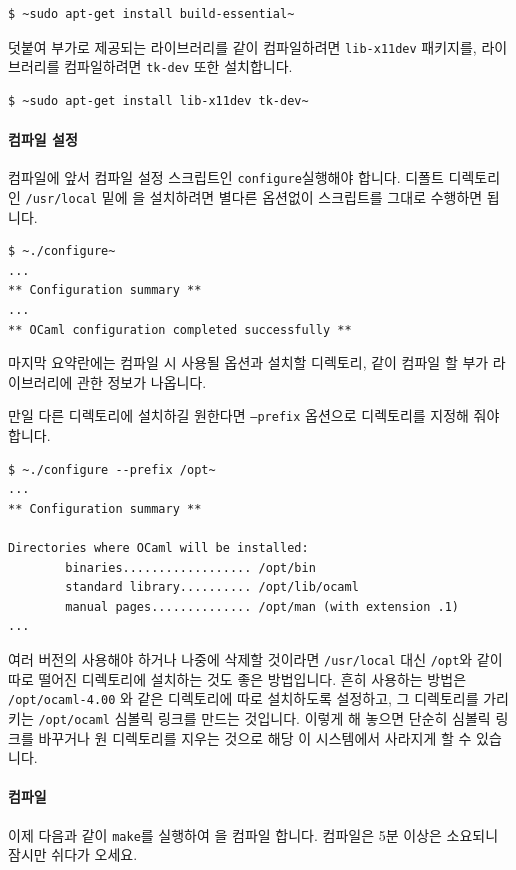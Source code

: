 \begin{lstlisting}
$ ~sudo apt-get install build-essential~
\end{lstlisting}

덧붙여 부가로 제공되는 \GRAPHICS{} 라이브러리를 같이 컴파일하려면
\texttt{lib-x11dev} 패키지를, \LABLTK{} 라이브러리를 컴파일하려면 \texttt{tk-dev}
또한 설치합니다.

\begin{lstlisting}
$ ~sudo apt-get install lib-x11dev tk-dev~
\end{lstlisting}

\paragraph{컴파일 설정} 컴파일에 앞서 컴파일 설정 스크립트인
\texttt{configure}\를 실행해야 합니다. 디폴트 디렉토리인 \texttt{/usr/local}
밑에 \OCAML{}을 설치하려면 별다른 옵션없이 스크립트를 그대로 수행하면 됩니다.

\begin{lstlisting}
$ ~./configure~
...
** Configuration summary **
...
** OCaml configuration completed successfully **
\end{lstlisting}

마지막 요약란에는 컴파일 시 사용될 옵션과 설치할 디렉토리, 같이 컴파일 할 부가
라이브러리에 관한 정보가 나옵니다.

만일 다른 디렉토리에 설치하길 원한다면 \texttt{--prefix} 옵션으로 디렉토리를
지정해 줘야 합니다.

\begin{lstlisting}
$ ~./configure --prefix /opt~
...
** Configuration summary **

Directories where OCaml will be installed:
        binaries.................. /opt/bin
        standard library.......... /opt/lib/ocaml
        manual pages.............. /opt/man (with extension .1)
...
\end{lstlisting}

여러 버전의 \OCAML{}\을 사용해야 하거나 나중에 \OCAML{}\을 삭제할 것이라면
\texttt{/usr/local} 대신 \texttt{/opt}와 같이 따로 떨어진 디렉토리에 설치하는
것도 좋은 방법입니다. 흔히 사용하는 방법은 \texttt{/opt/ocaml-4.00} 와 같은
디렉토리에 따로 설치하도록 설정하고, 그 디렉토리를 가리키는
\texttt{/opt/ocaml} 심볼릭 링크를 만드는 것입니다. 이렇게 해 놓으면 단순히
심볼릭 링크를 바꾸거나 원 디렉토리를 지우는 것으로 해당 \OCAML{}이 시스템에서
사라지게 할 수 있습니다.

\paragraph{컴파일} 이제 다음과 같이 \texttt{make}를 실행하여 \OCAML{}을 컴파일
합니다. 컴파일은 5분 이상은 소요되니 잠시만 쉬다가 오세요.

